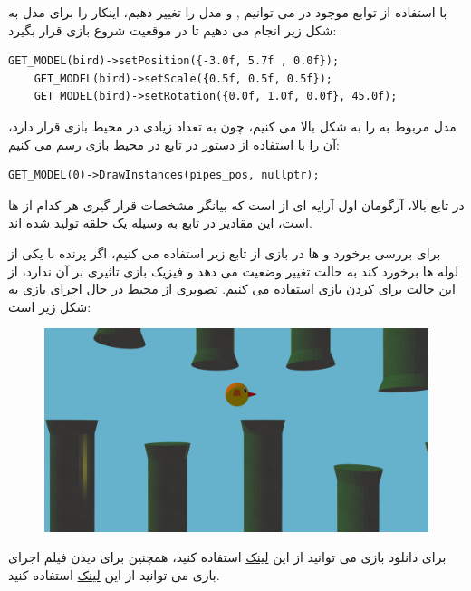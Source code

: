 \documentclass[a4paper, 12pt]{report}
\newcommand{\lrit}[1]{\lr{\textit{#1}}}
\begin{document}
    با استفاده از توابع موجود در  می توانیم ,  و   مدل را تغییر دهیم، اینکار را برای مدل  به شکل زیر انجام می دهیم تا در موقعیت شروع بازی قرار بگیرد:

    \begin{LTR}
    \small
        \begin{lstlisting}[style=C++Style,caption=\lrit{position, scale, rotation}]
    GET_MODEL(bird)->setPosition({-3.0f, 5.7f , 0.0f});
    GET_MODEL(bird)->setScale({0.5f, 0.5f, 0.5f});
    GET_MODEL(bird)->setRotation({0.0f, 1.0f, 0.0f}, 45.0f);
        \end{lstlisting}
    \end{LTR}
    \normalsize
    \vspace*{0.3cm}

    مدل مربوط به  را به شکل بالا  می کنیم، چون  به تعداد زیادی در محیط بازی قرار دارد، آن را با استفاده از دستور در تابع  در محیط بازی رسم می کنیم:
        \begin{LTR}
    \small
        \begin{lstlisting}[style=C++Style,caption=\lrit{draw instances of a model}]
GET_MODEL(0)->DrawInstances(pipes_pos, nullptr);
        \end{lstlisting}
    \end{LTR}
    \normalsize
    \vspace*{0.3cm}
    در تابع بالا، آرگومان اول آرایه ای از  است که بیانگر مشخصات قرار گیری هر کدام از  ها است، این مقادیر در تابع  به وسیله یک حلقه تولید شده اند.\par
    برای بررسی برخورد  و  ها در بازی از تابع زیر استفاده می کنیم، اگر پرنده با یکی از لوله ها برخورد کند به حالت  تغییر وضعیت می دهد و فیزیک بازی تاثیری بر آن ندارد، از این حالت برای  کردن بازی استفاده می کنیم.
    تصویری از محیط در حال اجرای بازی به شکل زیر است:
    \begin{figure}[H]
    \centering
    \href{https://github.com/devprofile98/shm}{
        \includegraphics[width=14cm]{images/flappybird.png}
    }
    \caption{\fontsize{11pt}{1.0cm}\zarbold\textbf{}}
    \label{fig:my_label}
\end{figure}
    برای دانلود بازی می توانید از این \href{https://github.com/devprofile98/shm/releases/tag/v0.1-alpha}{لینک} استفاده کنید، همچنین برای دیدن فیلم اجرای بازی می توانید از این \href{https://youtu.be/JqjluAjQV84}{لینک} استفاده کنید.
\end{document}
